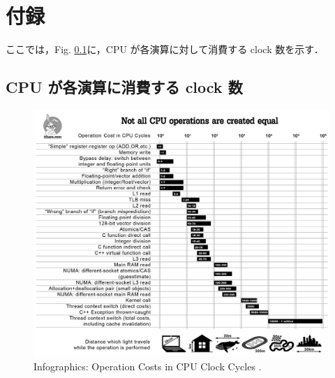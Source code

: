 \chapter*{付録} %

ここでは，Fig. \ref{fig_part101_infographics}に，CPU が各演算に対して消費する clock 数を示す．

\setcounter{section}{0} %
\renewcommand{\thesection}{\Alph{section}} %
\setcounter{equation}{0} %
\renewcommand{\theequation}{\Alph{section}.\arabic{equation}}
\setcounter{figure}{0} %
\renewcommand{\thefigure}{\Alph{section}.\arabic{figure}}
\setcounter{table}{0} %
\renewcommand{\thetable}{\Alph{section}.\arabic{table}}

\section{CPU が各演算に消費する clock 数}
\begin{figure}[h] %
  \centering
  \includegraphics[width=17.25cm]{./fig/part101_infographics_v08.png}
  \caption{
    Infographics: Operation Costs in CPU Clock Cycles \citep{NoBugsHare2016}.
  }
  \label{fig_part101_infographics}
\end{figure}



